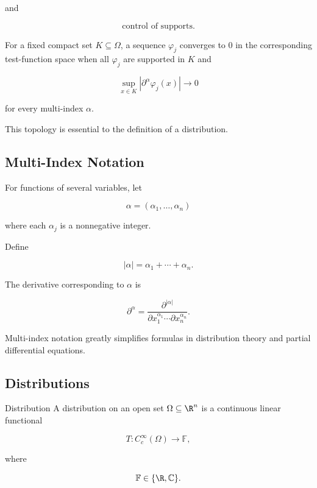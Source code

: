 and

\[
\boxed{
\text{control of supports}.
}
\]

For a fixed compact set \(K\subseteq\Omega\), a sequence
\(\varphi_j\) converges to \(0\) in the corresponding test-function
space when all \(\varphi_j\) are supported in \(K\) and

\[
\boxed{
\sup_{x\in K}
|\partial^\alpha\varphi_j(x)|
\to0
}
\]

for every multi-index \(\alpha\).

This topology is essential to the definition of a distribution.

\subsection{Multi-Index Notation}
\label{subsec:distribution-multi-index}

For functions of several variables, let

\[
\alpha
=
(\alpha_1,\ldots,\alpha_n)
\]

where each \(\alpha_j\) is a nonnegative integer.

Define

\[
\boxed{
|\alpha|
=
\alpha_1+\cdots+\alpha_n.
}
\]

The derivative corresponding to \(\alpha\) is

\[
\boxed{
\partial^\alpha
=
\frac{
\partial^{|\alpha|}
}{
\partial x_1^{\alpha_1}
\cdots
\partial x_n^{\alpha_n}
}.
}
\]

Multi-index notation greatly simplifies formulas in distribution theory
and partial differential equations.

\subsection{Distributions}
\label{subsec:definition-distributions}

\begin{definitionbox}{Distribution}
A distribution on an open set \(\Omega\subseteq\R^n\) is a continuous
linear functional

\[
\boxed{
T:C_c^\infty(\Omega)\to\mathbb{F},
}
\]

where

\[
\mathbb{F}\in\{\R,\mathbb{C}\}.
\]
\end{definitionbox}

